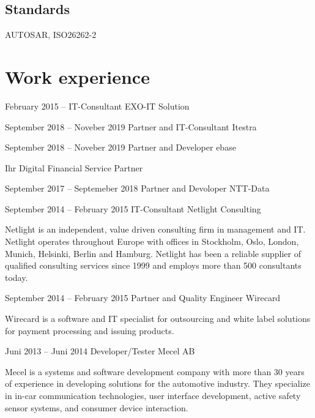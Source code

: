 \documentclass[fontsize=10pt]{tccv}
\begin{document}
\subsection{Standards}
AUTOSAR, ISO26262-2

\section{Work experience}

\begin{eventlist}

\item{February 2015 -- }
     {IT-Consultant}
     {EXO-IT Solution}

\item{September 2018 -- Noveber 2019}
     {Partner and IT-Consultant}
     {Itestra}

\item{September 2018 -- Noveber 2019}
     {Partner and Developer}
     {ebase}

Ihr Digital Financial Service Partner

\item{September 2017 -- Septemeber 2018}
     {Partner and Devoloper}
     {NTT-Data}

\item{September 2014 -- February 2015}
     {IT-Consultant}
     {Netlight Consulting}

Netlight is an independent, value driven consulting firm in management and IT.
Netlight operates throughout Europe with offices in Stockholm, Oslo, London,
Munich, Helsinki, Berlin and Hamburg. Netlight has been a reliable supplier of
qualified consulting services since 1999 and employs more than 500 consultants
today.


\item{September 2014 -- February 2015}
      {Partner and Quality Engineer}
      {Wirecard}

Wirecard is a software and IT specialist for outsourcing and white label
solutions for payment processing and issuing products.

\newpage

\item{Juni 2013 -- Juni 2014}
     {Developer/Tester}
     {Mecel AB}

Mecel is a systems and software development company with more than 30 years of
experience in developing solutions for the automotive industry. They specialize
in in-car communication technologies, user interface development, active safety
sensor systems, and consumer device interaction.\\


\end{eventlist}
\end{document}
